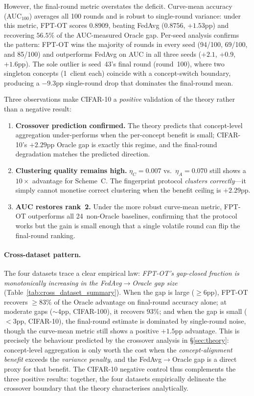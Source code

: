 However, the final-round metric overstates the deficit.
Curve-mean accuracy (AUC$_{100}$) averages all 100 rounds and is robust to single-round variance: under this metric, FPT-OT scores $0.8909$, beating FedAvg ($0.8756$, $+1.53$pp) and recovering $56.5\%$ of the AUC-measured Oracle gap.
Per-seed analysis confirms the pattern: FPT-OT wins the majority of rounds in every seed (94/100, 69/100, and 85/100) and outperforms FedAvg on AUC in all three seeds ($+2.1$, $+0.9$, $+1.6$pp).
The sole outlier is seed~43's final round (round~100), where two singleton concepts (1~client each) coincide with a concept-switch boundary, producing a $-9.3$pp single-round drop that dominates the final-round mean.

Three observations make CIFAR-10 a \emph{positive} validation of the theory rather than a negative result:
\begin{enumerate}[leftmargin=*,topsep=2pt,itemsep=1pt]
  \item \textbf{Crossover prediction confirmed.} The theory predicts that concept-level aggregation under-performs when the per-concept benefit is small; CIFAR-10's $+2.29$pp Oracle gap is exactly this regime, and the final-round degradation matches the predicted direction.
  \item \textbf{Clustering quality remains high.} $\eta_C = 0.007$ vs.\ $\eta_A = 0.070$ still shows a $10\times$ advantage for Scheme~C.  The fingerprint protocol \emph{clusters correctly}---it simply cannot monetise correct clustering when the benefit ceiling is $+2.29$pp.
  \item \textbf{AUC restores rank~2.} Under the more robust curve-mean metric, FPT-OT outperforms all 24~non-Oracle baselines, confirming that the protocol works but the gain is small enough that a single volatile round can flip the final-round ranking.
\end{enumerate}

\paragraph{Cross-dataset pattern.}
The four datasets trace a clear empirical law: \emph{FPT-OT's gap-closed fraction is monotonically increasing in the FedAvg$\to$Oracle gap size} (Table~\ref{tab:cross_dataset_summary}).
When the gap is large ($\ge 6$pp), FPT-OT recovers $\ge 83$\% of the Oracle advantage on final-round accuracy alone; at moderate gaps ($\sim 4$pp, CIFAR-100), it recovers $93\%$; and when the gap is small ($<3$pp, CIFAR-10), the final-round estimate is dominated by single-round noise, though the curve-mean metric still shows a positive $+1.5$pp advantage.
This is precisely the behaviour predicted by the crossover analysis in \S\ref{sec:theory}: concept-level aggregation is only worth the cost when the \emph{concept-alignment benefit} exceeds the \emph{variance penalty}, and the FedAvg$\to$Oracle gap is a direct proxy for that benefit.
The CIFAR-10 negative control thus complements the three positive results: together, the four datasets empirically delineate the crossover boundary that the theory characterises analytically.


